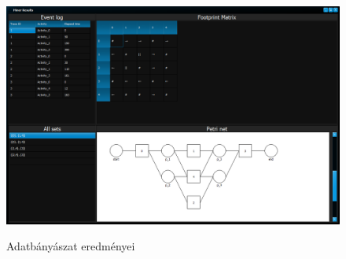 \begin{figure}[h!]
	\begin{center}
		\includegraphics[width=\textwidth, keepaspectratio=true]{images/img_datamining_results}\\
		\caption{Adatbányászat eredményei}
		\label{fig:example}
	\end{center}
\end{figure}




















